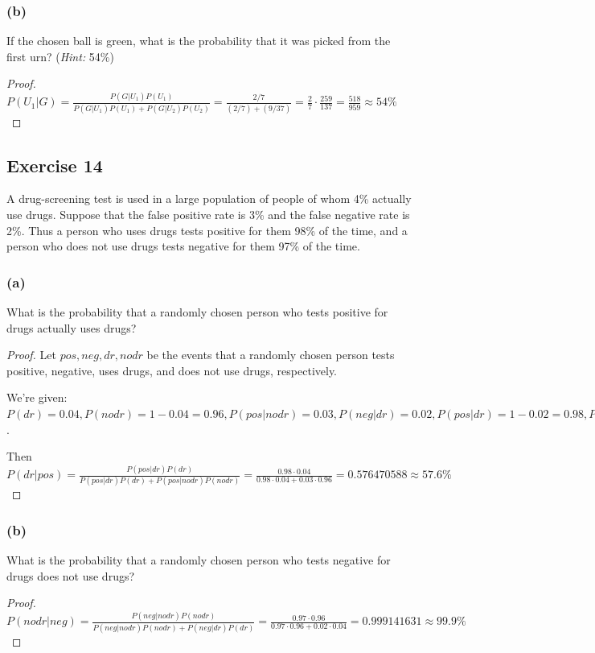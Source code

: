 \documentclass[14pt]{extarticle}
\begin{document}
\subsubsection{(b)}
If the chosen ball is green, what is the probability that it was picked from the first urn? ({\it Hint:} 54\%)

\begin{proof}
     \(P(U_1|G) = \frac{P(G|U_1)P(U_1)}{P(G|U_1)P(U_1) + P(G|U_2)P(U_2)} = \frac{2/7}{(2/7) + (9/37)} = \frac{2}{7} \cdot
     \frac{259}{137} = \frac{518}{959} \approx 54\%\)
\end{proof}

\subsection{Exercise 14}
A drug-screening test is used in a large population of people of whom 4\% actually use drugs. Suppose that the false
positive rate is 3\% and the false negative rate is 2\%. Thus a person who uses drugs tests positive for them 98\% of the
time, and a person who does not use drugs tests negative for
them 97\% of the time.

\subsubsection{(a)}
What is the probability that a randomly chosen person who tests positive for drugs actually uses drugs?

\begin{proof}
     Let \(pos, neg, dr, nodr\) be the events that a randomly chosen person tests positive, negative, uses drugs, and does
     not use drugs, respectively.

     We're given: \(P(dr) = 0.04, P(nodr) = 1 - 0.04 = 0.96, P(pos|nodr) = 0.03, P(neg|dr) = 0.02, P(pos|dr) = 1 - 0.02 =
     0.98, P(neg|nodr) = 1 - 0.03 = 0.97\).

     Then \(P(dr|pos) = \frac{P(pos|dr)P(dr)}{P(pos|dr)P(dr) + P(pos|nodr)P(nodr)} = \frac{0.98 \cdot 0.04}{0.98 \cdot 0.04
          + 0.03 \cdot 0.96} = 0.576470588 \approx 57.6\%\)
\end{proof}

\subsubsection{(b)}
What is the probability that a randomly chosen person who tests negative for drugs does not use drugs?

\begin{proof}
     \(P(nodr|neg) = \frac{P(neg|nodr)P(nodr)}{P(neg|nodr) P(nodr) + P(neg|dr)P(dr)} = \frac{0.97 \cdot 0.96}{0.97 \cdot 0.96 + 0.02 \cdot 0.04} = 0.999141631 \approx 99.9\%\)
\end{proof}
\end{document}
